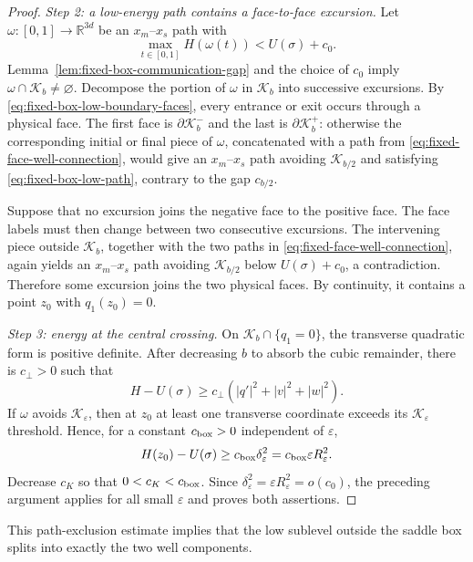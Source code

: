 \documentclass[11pt]{article}
\numberwithin{equation}{section}
\theoremstyle{plain}
\theoremstyle{definition}
\theoremstyle{remark}
\newcommand{\R}{\mathbb R}
\newcommand{\eps}{\varepsilon}
\begin{document}
\begin{proof}
\emph{Step 2: a low-energy path contains a face-to-face excursion.}
Let $\omega:[0,1]\to\R^{3d}$ be an $x_m$--$x_s$ path with
\begin{equation}
\label{eq:fixed-box-low-path}
\max_{t\in[0,1]}H(\omega(t))<U(\sigma)+c_0.
\end{equation}
Lemma~\ref{lem:fixed-box-communication-gap} and the choice of $c_0$ imply
$\omega\cap\mathcal K_b\ne\varnothing$.  Decompose the portion of
$\omega$ in $\mathcal K_b$ into successive excursions.  By
\eqref{eq:fixed-box-low-boundary-faces}, every entrance or exit occurs through
a physical face.  The first face is $\partial\mathcal K_b^-$ and the last
is $\partial\mathcal K_b^+$: otherwise the corresponding initial or final
piece of $\omega$, concatenated with a path from
\eqref{eq:fixed-face-well-connection}, would give an $x_m$--$x_s$ path avoiding
$\mathcal K_{b/2}$ and satisfying \eqref{eq:fixed-box-low-path}, contrary
to the gap $c_{b/2}$.

Suppose that no excursion joins the negative face to the positive face.  The
face labels must then change between two consecutive excursions.  The
intervening piece outside $\mathcal K_b$, together with the two paths in
\eqref{eq:fixed-face-well-connection}, again yields an $x_m$--$x_s$ path
avoiding $\mathcal K_{b/2}$ below $U(\sigma)+c_0$, a contradiction.
Therefore some excursion joins the two physical faces.  By continuity, it
contains a point $z_0$ with $q_1(z_0)=0$.

\emph{Step 3: energy at the central crossing.}
On $\mathcal K_b\cap\{q_1=0\}$, the transverse quadratic form is positive
definite.  After decreasing $b$ to absorb the cubic remainder, there is
$c_\perp>0$ such that
\begin{equation}
\label{eq:central-section-transverse-coercivity}
H-U(\sigma)
\ge c_\perp\left(|q'|^2+|v|^2+|w|^2\right).
\end{equation}
If $\omega$ avoids $\mathcal K_\eps$, then at $z_0$ at least one transverse
coordinate exceeds its $\mathcal K_\eps$ threshold.  Hence, for a constant
$c_{\rm box}>0$ independent of $\eps$,
\[
H(z_0)-U(\sigma)
\ge c_{\rm box}\delta_\eps^2
=c_{\rm box}\eps R_\eps^2.
\]
Decrease $c_K$ so that $0<c_K<c_{\rm box}$.  Since
$\delta_\eps^2=\eps R_\eps^2=o(c_0)$, the preceding argument applies for all
small $\eps$ and proves both assertions.
\end{proof}

This path-exclusion estimate implies that the low sublevel
outside the saddle box splits into exactly the two well components.
\end{document}
